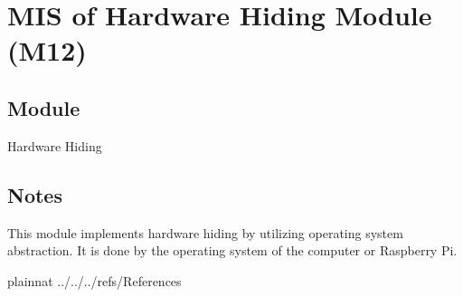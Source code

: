 \documentclass[12pt, titlepage]{article}
\begin{document}
\newpage
\section{MIS of Hardware Hiding Module (M12)} \label{M12}
\subsection{Module}

Hardware Hiding\\

\subsection{Notes}

This module implements hardware hiding by utilizing operating system abstraction. It is done by the operating system of the computer or Raspberry Pi.\\

\newpage

 {plainnat}
 {../../../refs/References}
\end{document}
